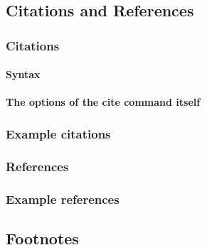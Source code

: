 \documentclass[%
reprint,
amsmath,amssymb,
aps,
floatfix,
]{revtex4-2}
\begin{document}
	\subsection{\label{sec:citeref}Citations and References}
	
	
	\subsubsection{Citations}
	
	
	\paragraph{Syntax}
	
	
	\paragraph{The options of the cite command itself}
	
	
	\subsubsection{Example citations}
	
	
	\subsubsection{References}
	
	
	\subsubsection{Example references}
	
	
	
	
	\subsection{Footnotes}%
	
\end{document}
